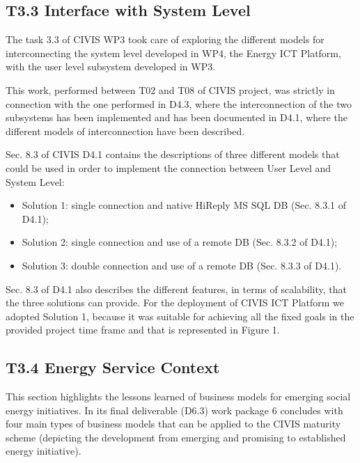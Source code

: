 \subsection{T3.3 Interface with System Level}

The task 3.3 of CIVIS WP3 took care of exploring the different models for interconnecting the system level developed in WP4, the Energy ICT Platform, with the user level subsystem developed in WP3.

This work, performed between T02 and T08 of CIVIS project, was strictly in connection with the one performed in D4.3, where the interconnection of the two subsystems has been implemented and has been documented in D4.1, where the different models of interconnection have been described.

Sec. 8.3 of CIVIS D4.1 contains the descriptions of three different models that could be used in order to implement the connection between User Level and System Level:

\begin{itemize}
\item Solution 1: single connection and native HiReply MS SQL DB (Sec. 8.3.1 of D4.1);
\item Solution 2: single connection and use of a remote DB (Sec. 8.3.2 of D4.1);
\item Solution 3: double connection and use of a remote DB (Sec. 8.3.3 of D4.1).
\end{itemize}

Sec. 8.3 of D4.1 also describes the different features, in terms of scalability, that the three solutions can provide. For the deployment of CIVIS ICT Platform we adopted Solution 1, because it was suitable for achieving all the fixed goals in the provided project time frame and that is represented in Figure 1.

\subsection{T3.4 Energy Service Context}

This section highlights the lessons learned of business models for emerging social energy initiatives.
In its final deliverable (D6.3) work package 6 concludes with four main types of business models that can be applied to the CIVIS maturity scheme (depicting the development from emerging and promising to established energy initiative). 

